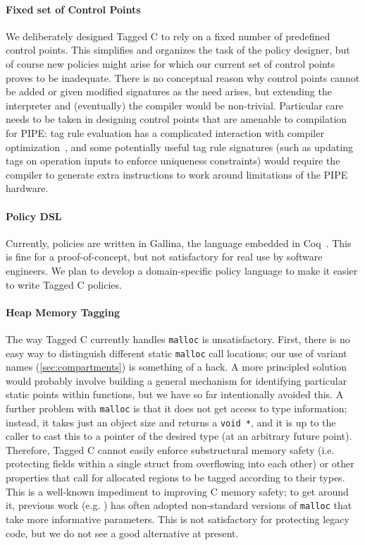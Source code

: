 \documentclass{llncs}
\begin{document}
\paragraph*{Fixed set of Control Points}
We deliberately designed Tagged C to rely on a fixed number of predefined
control points. This simplifies and organizes the task of the policy designer, but of course
new policies might arise for which our current set of
control points proves to be inadequate.  There is no conceptual reason why
control points cannot be added or given modified signatures as the need arises,
but extending the interpreter and (eventually) the compiler would be non-trivial.
Particular care needs to be taken in designing control points that are amenable
to compilation for PIPE: tag rule evaluation has a complicated interaction with
compiler optimization~\cite{Chhak21:Tagine}, and some potentially useful tag
rule signatures (such as updating tags on operation inputs to enforce uniqueness
constraints) would require the compiler to generate extra instructions to work
around limitations of the PIPE hardware.

\paragraph*{Policy DSL}
Currently, policies are written in Gallina, the language embedded in Coq~\cite{coq}. This is fine for a
proof-of-concept, but not satisfactory for real use by software engineers.
We plan to develop a domain-specific policy language to make it easier to write Tagged C policies.

\paragraph*{Heap Memory Tagging}
The way Tagged C currently handles {\tt malloc} is unsatisfactory. First, there is no
easy way to distinguish different static {\tt malloc} call locations; our use of
variant names (\cref{sec:compartments}) is something of a hack. A more principled solution
  would probably involve building a general mechanism for identifying particular
  static points within functions, but we have so far intentionally avoided this.
  A further problem with {\tt malloc} is that it does not get access to type information;
  instead, it takes just an object size and returns a {\tt void *}, and it is up to the caller to
  cast this to a pointer of the desired type (at an arbitrary future point).
  Therefore, Tagged C cannot easily
  enforce substructural memory safety (i.e. protecting fields within a single struct
  from overflowing into each other) or other properties that call for allocated
  regions to be tagged according to their types.
  This is a well-known impediment to improving C memory safety; to get around it,
  previous work  (e.g. \cite{Michael23:MSWASM}) has often adopted non-standard
  versions of {\tt malloc} that take more informative parameters. This is
  not satisfactory for protecting legacy code, but we do not see a good alternative at present.
\end{document}
